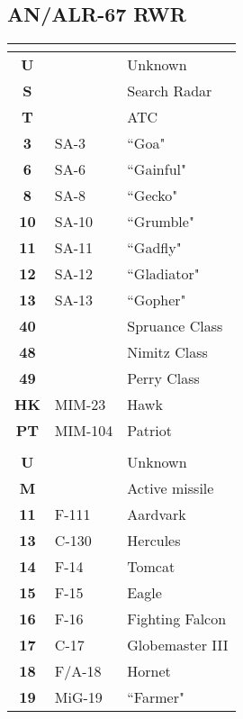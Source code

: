 \documentclass[fontInter]{TechCheck}
\begin{document}
	\cleardoublepage

	\subsection{AN/ALR-67 RWR}
	\begin{multicols*}{2}
		\begin{center}
			\begin{tabular}{c | p{1.5cm}  p{2.5cm}}
				\toprule
				\multicolumn{3}{c}{\blue{SURFACE}} \\
				\midrule
				\textbf{U} & & Unknown \\
				\textbf{S} & & Search Radar \\
				\textbf{T} & & ATC\\
				\midrule
				\textbf{3} & SA-3 & ``Goa" \\
				\textbf{6} & SA-6 & ``Gainful" \\
				\textbf{8} & SA-8 & ``Gecko" \\
				\midrule
				\textbf{10} & SA-10 & ``Grumble" \\
				\textbf{11} & SA-11 & ``Gadfly" \\
				\textbf{12} & SA-12 & ``Gladiator" \\
				\textbf{13} & SA-13 & ``Gopher" \\
				\midrule
				\textbf{40} & & Spruance Class \\
				\textbf{48} & & Nimitz Class \\
				\textbf{49} & & Perry Class \\
				\midrule
				\textbf{HK} & MIM-23 & Hawk \\
				\textbf{PT} & MIM-104 & Patriot \\
				\midrule
				\multicolumn{3}{c}{\blue{AIRBORNE}} \\
				\toprule
				\textbf{U} & & Unknown \\
				\textbf{M} & & Active missile \\
				\midrule
				\textbf{11} & F-111 &  Aardvark \\
				\textbf{13} & C-130 & Hercules \\
				\midrule
				\textbf{14} & F-14 & Tomcat \\
				\textbf{15} & F-15 & Eagle \\
				\textbf{16} & F-16 & Fighting Falcon \\
				\textbf{17} & C-17 & Globemaster III \\
				\textbf{18} & F/A-18 & Hornet \\
				\midrule
				\textbf{19} & MiG-19 & ``Farmer" \\

\end{tabular}
\end{center}
\end{multicols*}
\end{document}
